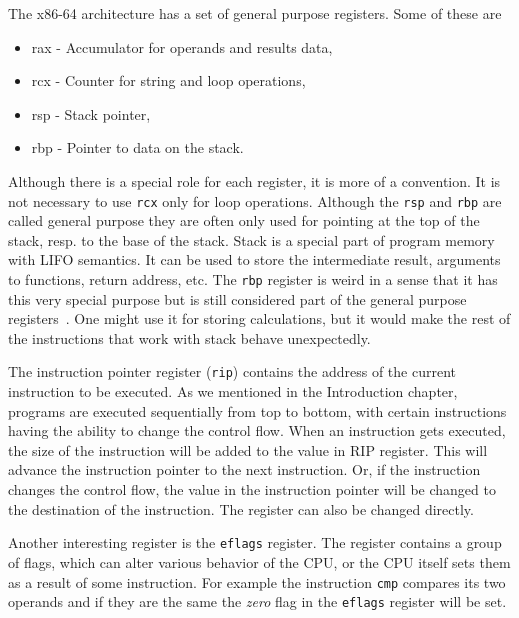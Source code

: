 The x86-64 architecture has a set of general purpose registers.
Some of these are
\begin{itemize}
    \item rax - Accumulator for operands and results data,
    \item rcx - Counter for string and loop operations,
    \item rsp - Stack pointer,
    \item rbp - Pointer to data on the stack.
\end{itemize}
Although there is a special role for each register, it is more of a convention.
It is not necessary to use \texttt{rcx} only for loop operations. Although the
\texttt{rsp} and \texttt{rbp} are called general purpose they are often only
used for pointing at the top of the stack, resp. to the base of the stack.
Stack is a special part of program memory with LIFO semantics. It can be used
to store the intermediate result, arguments to functions, return address, etc.
The \texttt{rbp} register is weird in a sense that it has this very special
purpose but is still considered part of the general purpose
registers~\cite{intel-manual}. One might use it for storing calculations, but
it would make the rest of the instructions that work with stack behave
unexpectedly.

The instruction pointer register (\texttt{rip}) contains the address of the
current instruction to be executed. As we mentioned in the Introduction
chapter, programs are executed sequentially from top to bottom, with certain
instructions having the ability to change the control flow. When an instruction
gets executed, the size of the instruction will be added to the value in RIP
register. This will advance the instruction pointer to the next instruction.
Or, if the instruction changes the control flow, the value in the instruction
pointer will be changed to the destination of the instruction. The register can
also be changed directly.

Another interesting register is the \texttt{eflags} register. The register
contains a group of flags, which can alter various behavior of the CPU, or the
CPU itself sets them as a result of some instruction. For example the
instruction \texttt{cmp} compares its two operands and if they are the same the
\textit{zero} flag in the \texttt{eflags} register will be set.

